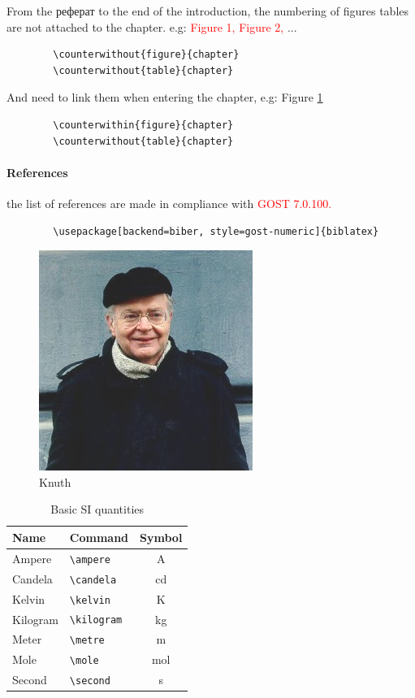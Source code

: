 From the реферат to the end of the introduction, the numbering of figures  tables are not attached to the chapter. e.g: \textcolor{red}{Figure 1, Figure 2,} ...
{
	\color{blue}
	\begin{verbatim}
		\counterwithout{figure}{chapter}
		\counterwithout{table}{chapter}
	\end{verbatim}
}
And need to link them when entering the chapter, e.g: Figure \ref{fig:3_1}
{
	\color{blue}
	\begin{verbatim}
		\counterwithin{figure}{chapter}			
		\counterwithout{table}{chapter}	
	\end{verbatim}
}

\paragraph{References} the list of references are made in compliance with \textcolor{red}{GOST 7.0.100.}
{
	\color{blue}
	\begin{verbatim}
		\usepackage[backend=biber, style=gost-numeric]{biblatex}
	\end{verbatim}
}
\begin{figure}
	\centering
	\includegraphics[width=0.4\linewidth]{images/knuth}
	\caption{Knuth}
	\label{fig:3_1}
\end{figure}

\begin{table}
	\centering
	\captionsetup{justification=centering} %
	\caption{Basic SI quantities}%
	\begin{tabular}{llc}
		\toprule
		Name 	& 	Command 	& 	Symbol        \\
		\midrule
		Ampere 	 & \verb|\ampere| 	&\si{\ampere}\\
		Candela  & \verb|\candela| 	& \si{\candela} \\
		Kelvin 	 & \verb|\kelvin| 	&\si{\kelvin}\\
		Kilogram & \verb|\kilogram| & \si{\kilogram} \\
		Meter 	 & \verb|\metre| 	&\si{\metre}\\
		Mole 	 & \verb|\mole| 	&\si{\mole}\\
		Second 	 & \verb|\second| 	&\si{\second}\\
		\bottomrule
	\end{tabular}
\end{table}